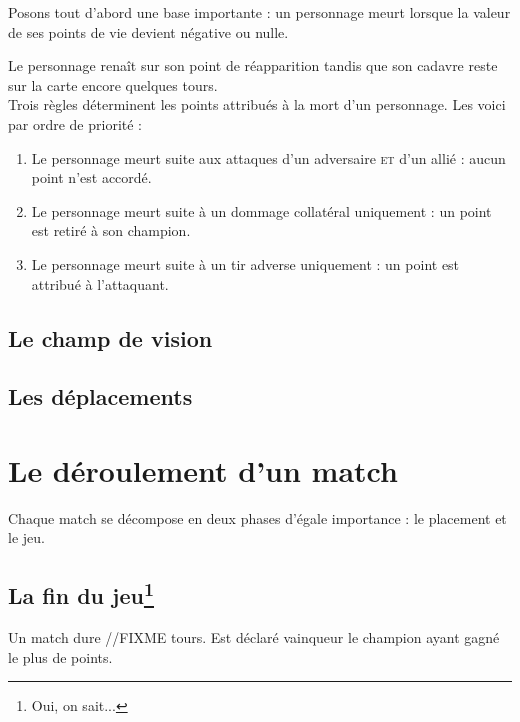 Posons tout d'abord une base importante : un personnage meurt lorsque
la valeur de ses points de vie devient négative ou nulle.

Le personnage renaît sur son point de réapparition tandis que son cadavre reste sur la carte encore quelques tours.\\

Trois règles déterminent les points attribués à la mort d'un
personnage. Les voici par ordre de priorité :

\begin{enumerate}
\item Le personnage meurt suite aux attaques d'un adversaire
  \textsc{et} d'un allié : aucun point n'est accordé.
\item Le personnage meurt suite à un dommage collatéral uniquement : un point est
  retiré à son champion.
\item Le personnage meurt suite à un tir adverse uniquement : un point
  est attribué à l'attaquant.
\end{enumerate}

\subsection{Le champ de vision}


\subsection{Les déplacements}

\newpage
\section{Le déroulement d'un match}

Chaque match se décompose en deux phases d'égale importance : le
placement et le jeu.

\subsection[La fin du jeu]{La fin du jeu\protect\footnote{Oui, on sait...}}

Un match dure //FIXME tours. Est déclaré vainqueur le champion ayant
gagné le plus de points.

